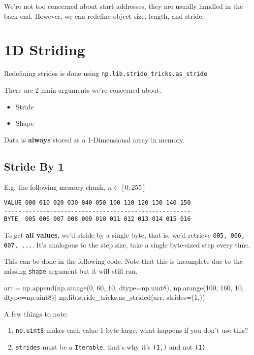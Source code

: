 \documentclass[oneside, 12pt]{report}
\begin{document}
We're not too concerned about start addresses, they are usually handled in the back-end. However, we can redefine object size, length, and stride.

\section{1D Striding}

Redefining strides is done using \verb+np.lib.stride_tricks.as_stride+

There are 2 main arguments we're concerned about.

\begin{itemize}
\item{Stride}
\item{Shape}
\end{itemize}

Data is \textbf{always} stored as a 1-Dimensional array in memory.

\subsection{Stride By 1}

E.g. the following memory chunk, $n \in [0, 255]$

\begin{verbatim}
VALUE 000 010 020 030 040 050 100 110 120 130 140 150
----- ----------------------------------------------- 
BYTE  005 006 007 008 009 010 011 012 013 014 015 016
\end{verbatim}

To get \textbf{all values}, we'd stride by a single byte, that is, we'd retrieve \verb+005, 006, 007, ...+. It's analogous to the step size, take a single byte-sized step every time.

This can be done in the following code. Note that this is incomplete due to the missing \verb+shape+ argument but it will still run.

\begin{python}
arr = np.append(np.arange(0, 60, 10, dtype=np.uint8),
                np.arange(100, 160, 10, dtype=np.uint8))
np.lib.stride_tricks.as_strided(arr, strides=(1,))
\end{python}

A few things to note:
\begin{enumerate}
\item{\verb+np.uint8+ makes each value 1 byte large, what happens if you don't use this?}
\item{\verb+strides+ must be a \verb+Iterable+, that's why it's \verb+(1,)+ and not \verb+(1)+}
\end{enumerate}
\end{document}

